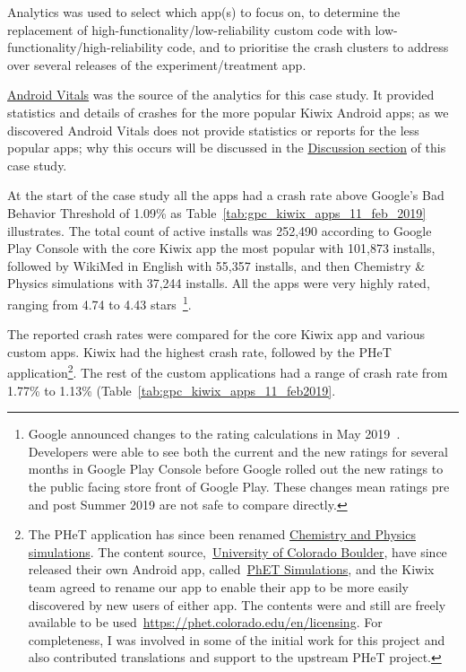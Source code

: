 Analytics was used to select which app(s) to focus on, to determine the replacement of high-functionality/low-reliability custom code with low-functionality/high-reliability code, and to prioritise the crash clusters to address over several releases of the experiment/treatment app.

\href{glossary_android_vitals}{Android Vitals} was the source of the analytics for this case study. It provided statistics and details of crashes for the more popular Kiwix Android apps; as we discovered Android Vitals does not provide statistics or reports for the less popular apps; why this occurs will be discussed in the \href{case-study-kiwix-discussion}{Discussion section} of this case study. 

At the start of the case study all the apps had a crash rate above Google's Bad Behavior Threshold of 1.09\% as Table~\ref{tab:gpc_kiwix_apps_11_feb_2019} illustrates. The total count of active installs was 252,490 according to Google Play Console with the core Kiwix app the most popular with 101,873 installs, followed by WikiMed in English with 55,357 installs, and then Chemistry \& Physics simulations with 37,244 installs. All the apps were very highly rated, ranging from 4.74 to 4.43 stars~\footnote{Google announced changes to the rating calculations in May 2019~\citep{androiddevelopersblog2019_io2019_whats_new_in_play}. Developers were able to see both the current and the new ratings for several months in Google Play Console before Google rolled out the new ratings to the public facing store front of Google Play. These changes mean ratings pre and post Summer 2019 are not safe to compare directly.}.

The reported crash rates were compared for the core Kiwix app and various custom apps. Kiwix had the highest crash rate, followed by the PHeT application\footnote{The PHeT application has since been renamed \href{https://play.google.com/store/apps/details?id=org.kiwix.kiwixcustomphet}{Chemistry and Physics simulations}. The content source,~\href{https://phet.colorado.edu/}{University of Colorado Boulder}, have since released their own Android app, called~\href{https://play.google.com/store/apps/details?id=edu.colorado.phet.androidApp}{PhET Simulations}, and the Kiwix team agreed to rename our app to enable their app to be more easily discovered by new users of either app. The contents were and still are freely available to be used~\url{https://phet.colorado.edu/en/licensing}. For completeness, I was involved in some of the initial work for this project and also contributed translations and support to the upstream PHeT project.}.
%
The rest of the custom applications had a range of crash rate from 1.77\% to 1.13\% (Table~\ref{tab:gpc_kiwix_apps_11_feb2019}.

